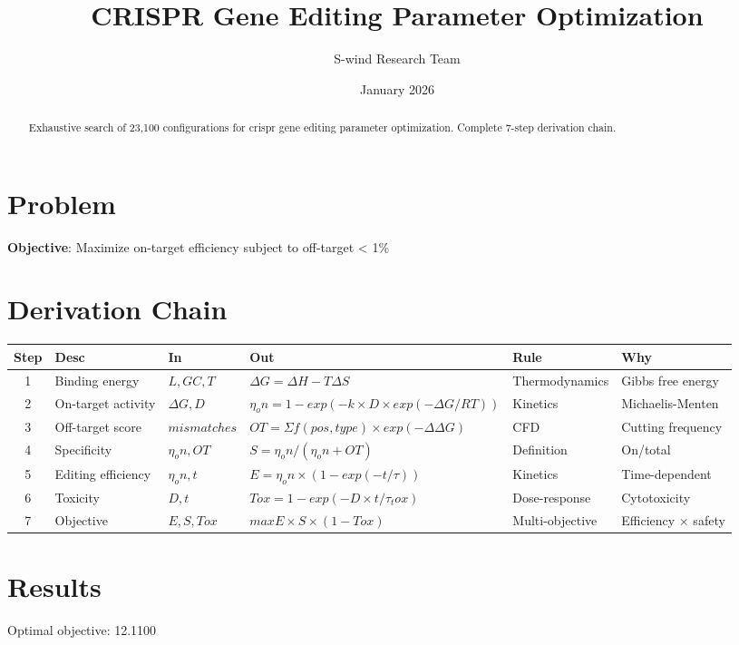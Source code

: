 \documentclass[11pt]{article}
\title{CRISPR Gene Editing Parameter Optimization}
\author{S-wind Research Team}
\date{January 2026}
\begin{document}
\maketitle

\begin{abstract}
Exhaustive search of 23,100 configurations for crispr gene editing parameter optimization. Complete 7-step derivation chain.
\end{abstract}

\section{Problem}
\textbf{Objective}: Maximize on-target efficiency subject to off-target < 1\%

\section{Derivation Chain}
\begin{longtable}{|c|p{2cm}|p{2cm}|p{3cm}|p{2cm}|p{3cm}|}
\hline
Step & Desc & In & Out & Rule & Why\\\hline\endhead
1 & Binding energy & $L, GC, T$ & $ΔG = ΔH - TΔS$ & Thermodynamics & Gibbs free energy\\\hline
2 & On-target activity & $ΔG, D$ & $η_on = 1 - exp(-k×D×exp(-ΔG/RT))$ & Kinetics & Michaelis-Menten\\\hline
3 & Off-target score & $mismatches$ & $OT = Σ f(pos, type)×exp(-ΔΔG)$ & CFD & Cutting frequency\\\hline
4 & Specificity & $η_on, OT$ & $S = η_on / (η_on + OT)$ & Definition & On/total\\\hline
5 & Editing efficiency & $η_on, t$ & $E = η_on × (1 - exp(-t/τ))$ & Kinetics & Time-dependent\\\hline
6 & Toxicity & $D, t$ & $Tox = 1 - exp(-D×t/τ_tox)$ & Dose-response & Cytotoxicity\\\hline
7 & Objective & $E, S, Tox$ & $max E × S × (1 - Tox)$ & Multi-objective & Efficiency × safety\\\hline
\end{longtable}

\section{Results}
Optimal objective: 12.1100
\end{document}
